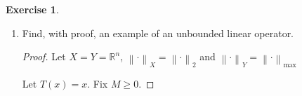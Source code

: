 \documentclass{article}
\theoremstyle{plain} %
\numberwithin{thm}{section} %
\theoremstyle{definition}
\newtheorem{exercise}[thm]{Exercise} %
\begin{document}
\begin{exercise}
\begin{enumerate}[label=(\alph*)]
            \item Find, with proof, an example of an unbounded linear operator.
            
            \begin{proof}
                Let \(X=Y=\mathbb{R} ^n\), \(\left\lVert \cdot \right\rVert _X=\left\lVert \cdot \right\rVert _2\) and
                \(\left\lVert \cdot \right\rVert _Y=\left\lVert \cdot \right\rVert _{\max} \)
                
                Let \(T(x) = x\). Fix \(M \geq 0\). 
            \end{proof}
        \end{enumerate}
    \end{exercise}
\end{document}
